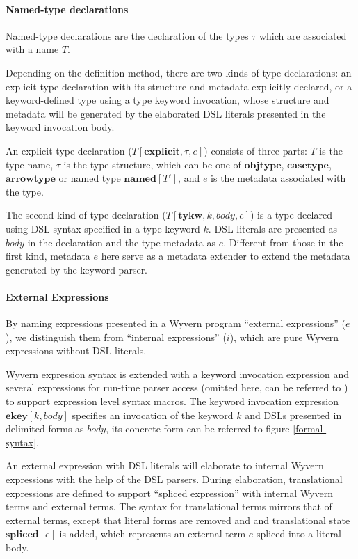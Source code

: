\documentclass{sig-alternate}
\begin{document}
\paragraph{Named-type declarations}
Named-type declarations are the declaration of the types $\tau$ which are associated with a name $T$.

Depending on the definition method, there are two kinds of type declarations: an explicit type declaration with its structure and metadata explicitly declared, or a keyword-defined type using a type keyword invocation, whose structure and metadata will be generated by the elaborated DSL literals presented in the keyword invocation body.

An explicit type declaration ($T[\mathbf{explicit},\tau,e]$) consists of three parts: $T$ is the type name, $\tau$ is the type structure, which can be one of $\mathbf{objtype}$, $\mathbf{casetype}$, $\mathbf{arrowtype}$ or named type $\mathbf{named}[T']$,  and $e$ is the metadata associated with the type.

The second kind of type declaration ($T[\mathbf{tykw},k,body,e]$) is a type declared using DSL syntax specified in a type keyword $k$. DSL literals are presented as $body$ in the declaration and the type metadata as $e$. Different from those in the first kind, metadata $e$ here serve as a metadata extender to extend the metadata generated by the keyword parser.

\paragraph{External Expressions}
By naming expressions presented in a Wyvern program ``external expressions'' ($e$), we distinguish them from ``internal expressions'' ($i$), which are pure Wyvern expressions without DSL literals. 

Wyvern expression syntax is extended with a keyword invocation expression and several expressions for run-time parser access (omitted here, can be referred to ) to support expression level syntax macros. The keyword invocation expression $\mathbf{ekey}[k,body]$ specifies an invocation of the keyword $k$ and DSLs presented in delimited forms as $body$, its concrete form can be referred to figure \ref{formal-syntax}.

An external expression with DSL literals will elaborate to internal Wyvern expressions with the help of the DSL parsers. During elaboration, translational expressions  
are defined to support ``spliced expression'' with internal Wyvern terms and external terms. The syntax for translational terms mirrors that of external terms, except that literal forms are removed and and translational state $\mathbf{spliced}[e]$ is added, which represents an external term $e$ spliced into a literal body.
\end{document}
